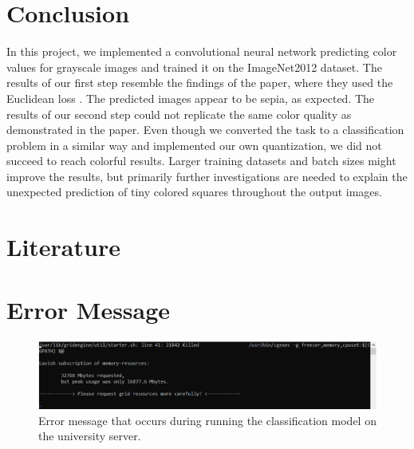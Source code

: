 \documentclass[12pt,letterpaper]{article}
\begin{document}
\section{Conclusion}
In this project, we implemented a convolutional neural network predicting color values for grayscale images \citep{Zhang.2016} and trained it on the ImageNet2012 dataset. The results of our first step resemble the findings of the paper, where they used the Euclidean loss \citep{Zhang.2016}. The predicted images appear to be sepia, as expected. The results of our second step could not replicate the same color quality as demonstrated in the paper. Even though we converted the task to a classification problem in a similar way and implemented our own quantization, we did not succeed to reach colorful results. Larger training datasets and batch sizes might improve the results, but primarily further investigations are needed to explain the unexpected prediction of tiny colored squares throughout the output images.
\newpage
\thispagestyle{empty}
\section{Literature}
\label{Lit}

\renewcommand{\bibsection}{}



\newpage
\appendix
{}
\section{Error Message}
\begin{figure}[ht]
	\centering
	\includegraphics[width=1.0\textwidth]{error.png}
	\caption{Error message that occurs during running the classification model on the university server.}
	\label{error}
\end{figure}

	
\end{document}
